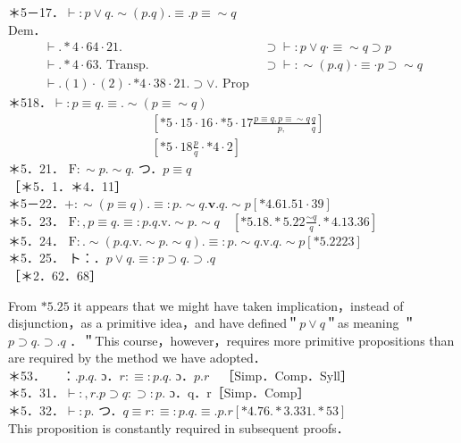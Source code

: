 \documentclass[10pt]{article}
\begin{document}
＊5－17．$\vdash: p \vee q . \sim(p . q) . \equiv . p \equiv \sim q$\\
Dem．
\[
\begin{array}{ll}
\vdash . * 4 \cdot 64 \cdot 21 . & \supset \vdash: p \vee q \cdot \equiv \sim q \supset p \\
\vdash . * 4 \cdot 63 . \text { Transp. } & \supset \vdash: \sim(p . q) \cdot \equiv \cdot p \supset \sim q  \tag{2}\\
\vdash .(1) \cdot(2) \cdot * 4 \cdot 38 \cdot 21 . \supset \vee . \text { Prop }
\end{array}
\]
＊518．$\vdash: p \equiv q . \equiv . \sim(p \equiv \sim q)$
$$
\begin{aligned}
& {\left[* 5 \cdot 15 \cdot 16 \cdot * 5 \cdot 17 \frac{p \equiv q, p \equiv \sim q}{p,} \frac{q}{q}\right]} \\
& {\left[* 5 \cdot 18 \frac{p}{q} \cdot * 4 \cdot 2\right]}
\end{aligned}
$$
＊5．21． $\mathrm{F}: \sim p . \sim q$. つ．$p \equiv q$\\
［＊5．1．＊4．11］\\
＊5－22．$+: \sim(p \equiv q) . \equiv: p . \sim q . \mathbf{v} . q . \sim p[* 4.61 .51 \cdot 39]$\\
＊5．23． $\mathrm{F}:, p \equiv q . \equiv: p . q . \mathrm{v} . \sim p . \sim q \quad\left[* 5.18 . * 5.22 \frac{\sim q}{q} . * 4.13 .36\right]$\\
＊5．24． $\mathrm{F}: . \sim(p . q . \mathrm{v} . \sim p . \sim q) . \equiv: p . \sim q . \mathrm{v} . q . \sim p[* 5.2223]$\\
＊5．25． ト：．$p \vee q . \equiv: p \supset q . \supset . q$\\
［＊2．62．68］

From $* 5.25$ it appears that we might have taken implication，instead of disjunction，as a primitive idea，and have defined＂$p \vee q$＂as meaning ＂$p \supset q . \supset . q$ ．＂This course，however，requires more primitive propositions than are required by the method we have adopted．\\
＊53．$\quad$ ：$. p . q$. ɔ．$r: \equiv: p . q$. ɔ．$p . r \quad$［Simp．Comp．Syll］\\
＊5．31．$\vdash:, r . p \supset q: \supset: p$. ɔ．q．r［Simp．Comp］\\
＊5．32．$\vdash: p$. つ．$q \equiv r: \equiv: p . q . \equiv . p . r[* 4.76 . * 3.331 . * 53]$\\
This proposition is constantly required in subsequent proofs．
\end{document}

